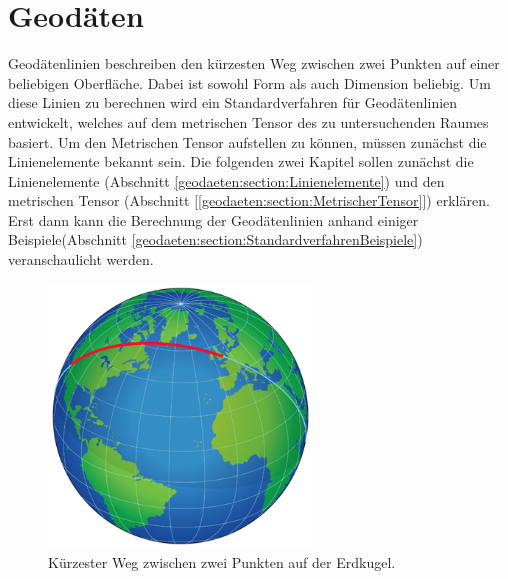 %
%
%
%
\chapter{Geodäten\label{chapter:geodaeten}}
\begin{refsection}

Geodätenlinien beschreiben den kürzesten Weg zwischen zwei Punkten auf einer beliebigen Oberfläche.
Dabei ist sowohl Form als auch Dimension beliebig.
Um diese Linien zu berechnen wird ein Standardverfahren für Geodätenlinien entwickelt, welches auf dem metrischen Tensor des zu untersuchenden Raumes basiert.
Um den Metrischen Tensor aufstellen zu können, müssen zunächst die Linienelemente bekannt sein.
Die folgenden zwei Kapitel sollen zunächst die Linienelemente (Abschnitt \ref{geodaeten:section:Linienelemente}) und den metrischen Tensor (Abschnitt [\ref{geodaeten:section:MetrischerTensor}]) erklären.
Erst dann kann die Berechnung der Geodätenlinien anhand einiger Beispiele(Abschnitt \ref{geodaeten:section:StandardverfahrenBeispiele}) veranschaulicht werden.

\begin{figure}
	\centering
	\includegraphics[width=7cm]{papers/geodaeten/Abbildungen/Orthodromic_air_route}
	\caption{Kürzester Weg zwischen zwei Punkten auf der Erdkugel. \cite{geodaeten:Geodäte}}
	\label{geodaeten:figure:Geodaeten:Erdkugel}
\end{figure}






\printbibliography[heading=subbibliography]
\end{refsection}
